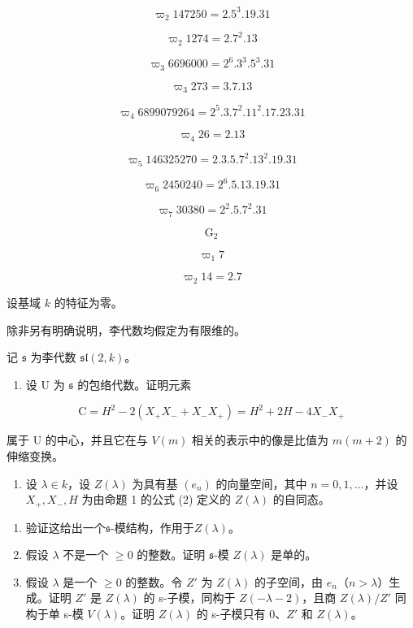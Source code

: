 \[
\varpi_ {2} 147250 = 2.5 ^ {3}.19.31
\]

\[
\varpi_ {2} 1274 = 2.7 ^ {2}.13
\]

\[
\varpi_ {3} 6696000 = 2 ^ {6}.3 ^ {3}.5 ^ {3}.31
\]

\[
\varpi_ {3} 273 = 3.7.13
\]

\[
\varpi_ {4} 6899079264 = 2 ^ {5}.3.7 ^ {2}.11 ^ {2}.17.23.31
\]

\[
\varpi_ {4} 26 = 2.13
\]

\[
\varpi_ {5} 146325270 = 2.3.5.7 ^ {2}.13 ^ {2}.19.31
\]

\[
\varpi_ {6} 2450240 = 2 ^ {6}.5.13.19.31
\]

\[
\varpi_ {7} 30380 = 2 ^ {2}.5.7 ^ {2}.31
\]

\[
\mathrm{G} _ {2}
\]

\[
\varpi_ {1} 7
\]

\[
\varpi_ {2} 14 = 2.7
\]


设基域 \(k\) 的特征为零。

除非另有明确说明，李代数均假定为有限维的。


记 \(\mathfrak{s}\) 为李代数 \(\mathfrak{sl}(2,k)\)。

\begin{enumerate}
\def\labelenumi{\arabic{enumi})}
\tightlist
\item
  设 \(\mathrm{U}\) 为 \(\mathfrak{s}\) 的包络代数。证明元素
\end{enumerate}

\[
\mathrm{C} = H ^ {2} - 2 (X _ {+} X _ {-} + X _ {-} X _ {+}) = H ^ {2} + 2 H - 4 X _ {-} X _ {+}
\]

属于 U 的中心，并且它在与 \(V(m)\) 相关的表示中的像是比值为 \(m(m+2)\) 的伸缩变换。

\begin{enumerate}
\def\labelenumi{\arabic{enumi})}
\setcounter{enumi}{1}
\tightlist
\item
  设 \(\lambda \in k\)，设 \(Z(\lambda)\) 为具有基 \((e_n)\) 的向量空间，其中 \(n = 0,1,\ldots\)，并设 \(X_{+}, X_{-}, H\) 为由命题 1 的公式 (2) 定义的 \(Z(\lambda)\) 的自同态。
\end{enumerate}

\begin{enumerate}
\def\labelenumi{\alph{enumi})}
\item
  验证这给出一个\(\mathfrak{s}\)-模结构，作用于\(Z(\lambda)\)。
\item
  假设 \(\lambda\) 不是一个 \(\geq 0\) 的整数。证明 \(\mathfrak{s}\)-模 \(Z(\lambda)\) 是单的。
\item
  假设 \(\lambda\) 是一个 \(\geq 0\) 的整数。令 \(Z'\) 为 \(Z(\lambda)\) 的子空间，由 \(e_{n}\)（\(n > \lambda\)）生成。证明 \(Z'\) 是 \(Z(\lambda)\) 的 s-子模，同构于 \(Z(-\lambda - 2)\)，且商 \(Z(\lambda)/Z'\) 同构于单 s-模 \(V(\lambda)\)。证明 \(Z(\lambda)\) 的 s-子模只有 0、\(Z'\) 和 \(Z(\lambda)\)。
\end{enumerate}

